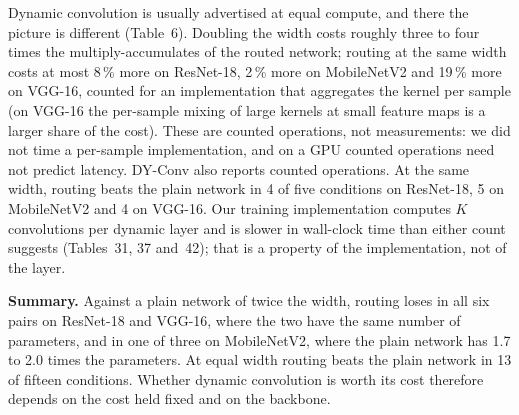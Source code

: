 \documentclass{article}
\begin{document}
Dynamic convolution is usually advertised at equal compute, and there the
picture is different (Table~6). Doubling the width costs
roughly three to four times the multiply-accumulates of the routed network;
routing at the same width costs at most 8\,\% more on
ResNet-18, 2\,\% more on MobileNetV2 and 19\,\%
more on VGG-16, counted for an implementation that aggregates the kernel
per sample (on VGG-16 the per-sample mixing of large kernels at small
feature maps is a larger share of the cost). These are counted operations,
not measurements: we did not time a per-sample implementation, and on a
GPU counted operations need not predict latency. DY-Conv also reports
counted operations. At the same width, routing
beats the plain network in 4 of five conditions on ResNet-18,
5 on MobileNetV2 and 4 on VGG-16. Our training
implementation computes $K$ convolutions per dynamic layer and is slower in
wall-clock time than either count suggests (Tables~31,
37 and~42); that is a property of the
implementation, not of the layer.

\textbf{Summary.}  Against a plain network of twice the width, routing
loses in all six pairs on ResNet-18 and VGG-16, where the two have the same
number of parameters, and in one of three on MobileNetV2, where the plain
network has 1.7 to 2.0 times the parameters. At equal
width routing beats the plain network in 13 of fifteen conditions.
Whether dynamic convolution is worth its cost therefore depends on the
cost held fixed and on the backbone.
\end{document}
